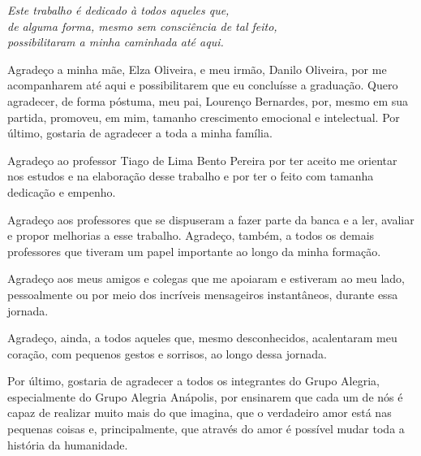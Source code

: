 \documentclass[
	12pt,				%
	openright,			%
    twoside,			%
	a4paper,			%
	chapter=TITLE,		%
	english,			%
	french,				%
	spanish,			%
	brazil				%
	]{abntex2}
\numberwithin{lema}{chapter}
\numberwithin{teorema}{chapter}
\numberwithin{definicao}{chapter}
\numberwithin{exemplo}{chapter}
\numberwithin{figure}{chapter}
\begin{document}
\frenchspacing

\pretextual
\imprimircapa
\imprimirfolhaderosto*

\begin{fichacatalografica}
	
\end{fichacatalografica}


\cleardoublepage

\begin{dedicatoria}
	\vspace*{\fill}
	\centering
	\noindent
	\textit{
		Este trabalho é dedicado à todos aqueles que,\\
		de alguma forma, mesmo sem consciência de tal feito,\\
		possibilitaram a minha caminhada até aqui.
	} \vspace*{\fill}
\end{dedicatoria}

\begin{agradecimentos}[AGRADECIMENTOS]
Agradeço a minha mãe, Elza Oliveira, e meu irmão, Danilo Oliveira, por me acompanharem até aqui e possibilitarem que eu concluísse a graduação. Quero agradecer, de forma póstuma, meu pai, Lourenço Bernardes, por, mesmo em sua partida, promoveu, em mim, tamanho crescimento emocional e intelectual. Por último, gostaria de agradecer a toda a minha família.

Agradeço ao professor Tiago de Lima Bento Pereira por ter aceito me orientar nos estudos e na elaboração desse trabalho e por ter o feito com tamanha dedicação e empenho. 

Agradeço aos professores que se dispuseram a fazer parte da banca e a ler, avaliar e propor melhorias a esse trabalho. Agradeço, também, a todos os demais professores que tiveram um papel importante ao longo da minha formação.

Agradeço aos meus amigos e colegas que me apoiaram e estiveram ao meu lado, pessoalmente ou por meio dos incríveis mensageiros instantâneos, durante essa jornada. 

Agradeço, ainda, a todos aqueles que, mesmo desconhecidos, acalentaram meu coração, com pequenos gestos e sorrisos, ao longo dessa jornada.

Por último, gostaria de agradecer a todos os integrantes do Grupo Alegria, especialmente do Grupo Alegria Anápolis, por ensinarem que cada um de nós é capaz de realizar muito mais do que imagina, que o verdadeiro amor está nas pequenas coisas e, principalmente, que através do amor é possível mudar toda a história da humanidade.
\end{agradecimentos}
\end{document}

